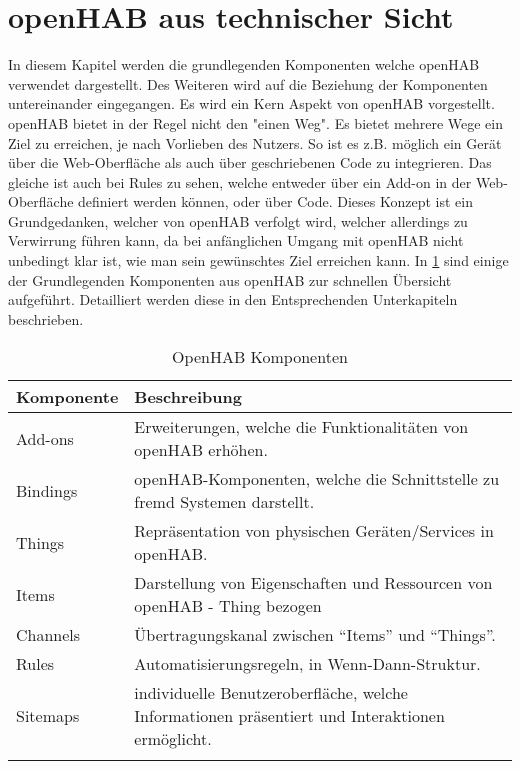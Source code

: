 \section{openHAB aus technischer Sicht}
In diesem Kapitel werden die grundlegenden Komponenten welche openHAB verwendet dargestellt. Des Weiteren wird auf die  Beziehung der Komponenten untereinander eingegangen. 
Es wird ein Kern Aspekt von openHAB vorgestellt. openHAB bietet in der Regel nicht den "einen Weg". Es bietet mehrere Wege ein Ziel zu erreichen, je nach Vorlieben des Nutzers. So ist es z.B. möglich ein Gerät über die Web-Oberfläche als auch über geschriebenen Code zu integrieren. Das gleiche ist auch bei Rules zu sehen, welche entweder über ein Add-on in der Web-Oberfläche definiert werden können, oder über Code. Dieses Konzept ist ein Grundgedanken, welcher von openHAB verfolgt wird, welcher allerdings zu Verwirrung führen kann, da bei anfänglichen Umgang mit openHAB nicht unbedingt klar ist, wie man sein gewünschtes Ziel erreichen kann.
In \ref{table:openhub-components} sind einige der Grundlegenden Komponenten aus openHAB zur schnellen Übersicht aufgeführt. Detailliert werden diese in den Entsprechenden Unterkapiteln beschrieben.

\begin{longtable}{| p{4cm} | p{11cm}|}
	\hline
	\textbf{Komponente} & \textbf{Beschreibung} \\
	\hline \hline
	\centering Add-ons & Erweiterungen, welche die Funktionalitäten von openHAB erhöhen. \\
	\hline
	\centering Bindings & openHAB-Komponenten, welche die Schnittstelle zu fremd Systemen darstellt.  \\
	\hline
	\centering Things & Repräsentation von physischen Geräten/Services in openHAB. \\
	\hline
	\centering Items & Darstellung von Eigenschaften und Ressourcen von openHAB - Thing bezogen \\
	\hline
	\centering Channels & Übertragungskanal zwischen "`Items"' und "`Things"'. \\
	\hline
	\centering Rules & Automatisierungsregeln, in Wenn-Dann-Struktur.\\
	\hline
	\centering Sitemaps & individuelle Benutzeroberfläche, welche Informationen präsentiert und Interaktionen ermöglicht.\\
	\hline
	\caption{OpenHAB Komponenten}
	\label{table:openhub-components}
\end{longtable}

